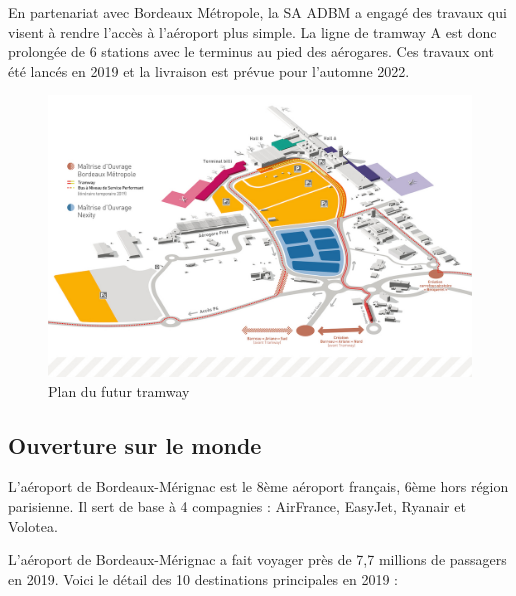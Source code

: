 En partenariat avec Bordeaux Métropole, la SA ADBM a engagé des travaux qui visent à rendre l'accès à l'aéroport plus simple. La ligne de tramway A est donc prolongée de 6 stations avec le terminus au pied des aérogares. Ces travaux ont été lancés en 2019 et la livraison est prévue pour l'automne 2022.\newline

\begin{figure}[hbt!]
    \centering
    \includegraphics[width=16cm]{Images/tramway.jpg}
    \caption{Plan du futur tramway}
    \label{fig:futurtram}
\end{figure}

\newpage

\subsection{Ouverture sur le monde}

L'aéroport de Bordeaux-Mérignac est le 8ème aéroport français, 6ème hors région parisienne. Il sert de base à 4 compagnies : AirFrance, EasyJet, Ryanair et Volotea.\newline

L'aéroport de Bordeaux-Mérignac a fait voyager près de 7,7 millions de passagers en 2019. Voici le détail des 10 destinations principales en 2019 :


